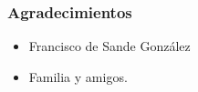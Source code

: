 \begin{frame}
  \frametitle{Agradecimientos}
    \begin{itemize}
    \item Francisco de Sande González
		\item Familia y amigos.
    \end{itemize}
  \endblock{}
\end{frame}
